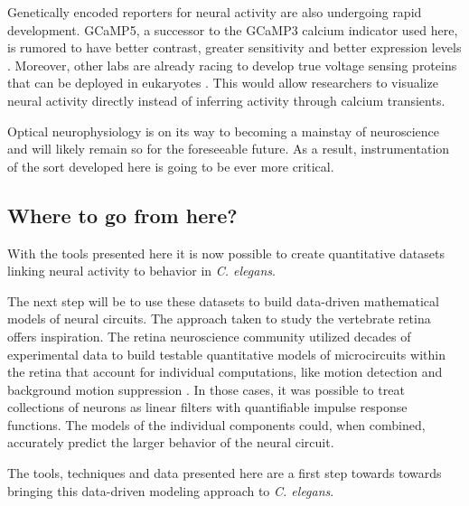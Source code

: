 Genetically encoded reporters for  neural activity are also undergoing rapid development. GCaMP5, a successor to the GCaMP3 calcium indicator used here, is rumored to  have better contrast, greater sensitivity and better expression levels \citep{hires_gcamp5_2011}. Moreover, other labs are already racing to develop true voltage sensing proteins that can be deployed in eukaryotes \citep{kralj_electrical_2011}. This would allow researchers to visualize neural activity directly instead of inferring activity through calcium transients. 

	Optical neurophysiology is on its way to becoming a mainstay of neuroscience and will likely remain so for the foreseeable future. 
As a result, instrumentation of the sort developed here is going to be ever more critical. 




\subsection*{Where to go from here?}
With the tools presented here it is now possible to  create  quantitative datasets linking neural activity to behavior in \textit{C. elegans}.

 The next step will be to use these datasets to  build data-driven mathematical models of neural circuits. The approach taken to study the vertebrate retina offers inspiration. The retina neuroscience community utilized decades of experimental data to  build  testable quantitative  models of microcircuits within the retina that account for individual computations, like motion detection and background motion suppression \citep{baccus_retinal_2008, gollisch_eye_2010}. In those cases, it was possible to treat collections of neurons as linear filters with quantifiable  impulse response functions. The models of the individual components could, when combined, accurately predict the larger behavior of the neural circuit. 

The tools, techniques and data presented here are a first step towards towards bringing this data-driven  modeling approach to \textit{C. elegans}.




 





